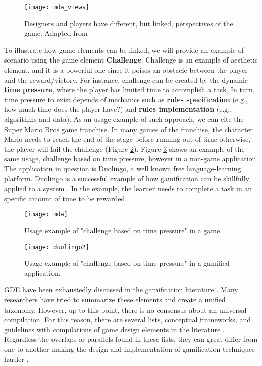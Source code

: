 \begin{figure}[h!]
\caption{Designers and players have different, but linked, perspectives of the game. Adapted from \cite{hunicke2004}}
\centering
\texttt{[image: mda\_views]}
\label{fig:mda_views}
\end{figure}

To illustrate how game elements can be linked, we will provide an example of scenario using the game element \textbf{Challenge}. Challenge is an example of aesthetic element, and it is a powerful one since it poises an obstacle between the player and the reward/victory. 
For instance, challenge can be created by the dynamic \textbf{time pressure}, where the player has limited time to accomplish a task. 
In turn, time pressure to exist depends of mechanics such as \textbf{rules specification} (e.g., how much time does the player have?) and \textbf{rules implementation} (e.g., algorithms and data). 
As an usage example of such approach, we can cite the Super Mario Bros \textsuperscript{\textregistered} game franchise. In many games of the franchise, the character Mario needs to reach the end of the stage before running out of time otherwise, the player will fail the challenge (Figure \ref{fig:mda}). Figure \ref{fig:duolingo} shows an example of the same usage, challenge based on time pressure, however in a non-game application. The application in question is Duolingo, a well known free language-learning platform. Duolingo is a successful example of how gamification can be skillfully applied to a system \cite{Huynh2016}. In the example, the learner needs to complete a task in an specific amount of time to be rewarded. 
\begin{figure}[h!]
\caption{Usage example of "challenge based on time pressure" in a game.}
\centering
\texttt{[image: mda]}
\label{fig:mda}
\end{figure}

\begin{figure}[h!]
\caption{Usage example of "challenge based on time pressure" in a gamified application.}
\centering
\texttt{[image: duolingo2]}
\label{fig:duolingo}
\end{figure}

GDE have been exhaustedly discussed in the gamification literature \cite{kapp2012gamification,robinson2013preliminary,werbach2012win,zichermann2010game,zichermann2011gamification,Ferro2013}.
Many researchers have tried to summarize these elements and create a unified taxonomy. However, up to this point, there is no consensus about an universal compilation. 
For this reason, 
there are several lists, conceptual frameworks, and guidelines with compilations of game design elements in the literature \cite{Ferro2013,A_Link_Between_Worlds}. 
Regardless the overlaps or parallels found in these lists, 
they can great differ from one to another making the design and implementation of gamification techniques harder \cite{Sailer2017}.


